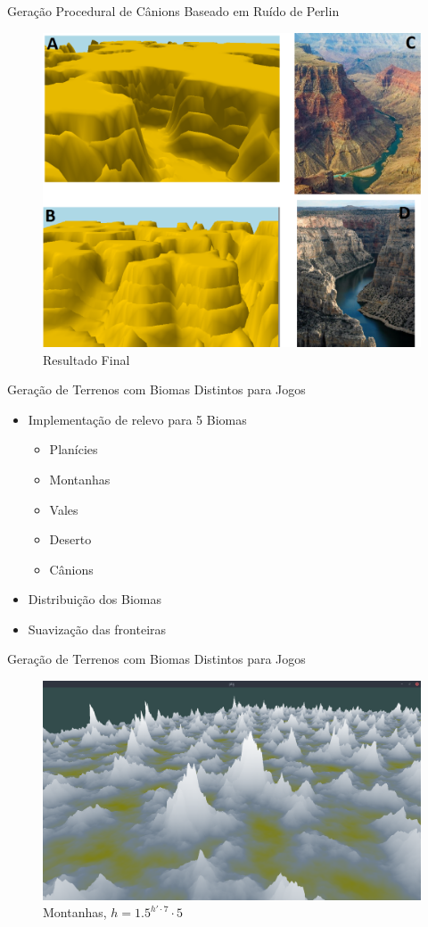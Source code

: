 \begin{frame}{Geração Procedural de Cânions Baseado em Ruído de Perlin}
  \begin{figure}
		\centering
        \includegraphics[width=.65\textwidth]{img/uffs/gabrielleResultado.png}
        \caption{Resultado Final}
  \end{figure}
\end{frame}


\begin{frame}{Geração de Terrenos com Biomas Distintos para Jogos}
    \begin{itemize}
        \item Implementação de relevo para 5 \alert{Biomas}
            \begin{itemize}
                \item Planícies
                \item Montanhas
                \item Vales
                \item Deserto
                \item Cânions
            \end{itemize}
        \item Distribuição dos Biomas
        \item Suavização das fronteiras
    \end{itemize}
\end{frame}

\begin{frame}{Geração de Terrenos com Biomas Distintos para Jogos}
    \begin{figure}
		\centering
        \includegraphics[width=.8\textwidth]{img/uffs/bssMontains.png}
        \caption{Montanhas, $h = 1.5^{h'\cdot 7}\cdot 5$}
    \end{figure}
\end{frame}

